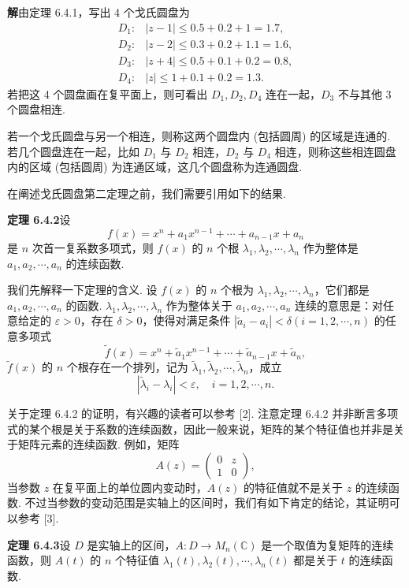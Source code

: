 \documentclass[UTF8, 12pt, fontset=fandol, oneside]{ctexart}
\begin{document}
\noindent\textbf{解}\quad 由定理 6.4.1，写出 4 个戈氏圆盘为
\[
\begin{array}{ll}
D_1: & |z-1|\leq 0.5+0.2+1=1.7,\\
D_2: & |z-2|\leq 0.3+0.2+1.1=1.6,\\
D_3: & |z+4|\leq 0.5+0.1+0.2=0.8,\\
D_4: & |z|\leq 1+0.1+0.2=1.3.
\end{array}
\]
若把这 4 个圆盘画在复平面上，则可看出 $D_1,D_2,D_4$ 连在一起，$D_3$ 不与其他 3 个圆盘相连.

若一个戈氏圆盘与另一个相连，则称这两个圆盘内 (包括圆周) 的区域是连通的. 若几个圆盘连在一起，比如 $D_1$ 与 $D_2$ 相连，$D_2$ 与 $D_4$ 相连，则称这些相连圆盘内的区域 (包括圆周) 为连通区域，这几个圆盘称为连通圆盘.

在阐述戈氏圆盘第二定理之前，我们需要引用如下的结果.

\noindent\textbf{定理 6.4.2}\quad 设
\[
f(x)=x^n+a_1x^{n-1}+\cdots+a_{n-1}x+a_n
\]
是 $n$ 次首一复系数多项式，则 $f(x)$ 的 $n$ 个根 $\lambda_1,\lambda_2,\cdots,\lambda_n$ 作为整体是 $a_1,a_2,\cdots,a_n$ 的连续函数.

我们先解释一下定理的含义. 设 $f(x)$ 的 $n$ 个根为 $\lambda_1,\lambda_2,\cdots,\lambda_n$，它们都是 $a_1,a_2,\cdots,a_n$ 的函数. $\lambda_1,\lambda_2,\cdots,\lambda_n$ 作为整体关于 $a_1,a_2,\cdots,a_n$ 连续的意思是：对任意给定的 $\varepsilon>0$，存在 $\delta>0$，使得对满足条件 $|\widetilde{a}_i-a_i|<\delta(i=1,2,\cdots,n)$ 的任意多项式
\[
\widetilde{f}(x)=x^n+\widetilde{a}_1x^{n-1}+\cdots+\widetilde{a}_{n-1}x+\widetilde{a}_n,
\]
$\widetilde{f}(x)$ 的 $n$ 个根存在一个排列，记为 $\widetilde{\lambda}_1,\widetilde{\lambda}_2,\cdots,\widetilde{\lambda}_n$，成立
\[
|\widetilde{\lambda}_i-\lambda_i|<\varepsilon,\quad i=1,2,\cdots,n.
\]

关于定理 6.4.2 的证明，有兴趣的读者可以参考 [2]. 注意定理 6.4.2 并非断言多项式的某个根是关于系数的连续函数，因此一般来说，矩阵的某个特征值也并非是关于矩阵元素的连续函数. 例如，矩阵
\[
A(z)=\left(\begin{array}{cc}
0 & z\\
1 & 0
\end{array}\right),
\]
当参数 $z$ 在复平面上的单位圆内变动时，$A(z)$ 的特征值就不是关于 $z$ 的连续函数. 不过当参数的变动范围是实轴上的区间时，我们有如下肯定的结论，其证明可以参考 [3].

\noindent\textbf{定理 6.4.3}\quad 设 $D$ 是实轴上的区间，$A:D\to M_n(\mathbb{C})$ 是一个取值为复矩阵的连续函数，则 $A(t)$ 的 $n$ 个特征值 $\lambda_1(t),\lambda_2(t),\cdots,\lambda_n(t)$ 都是关于 $t$ 的连续函数.
\end{document}
